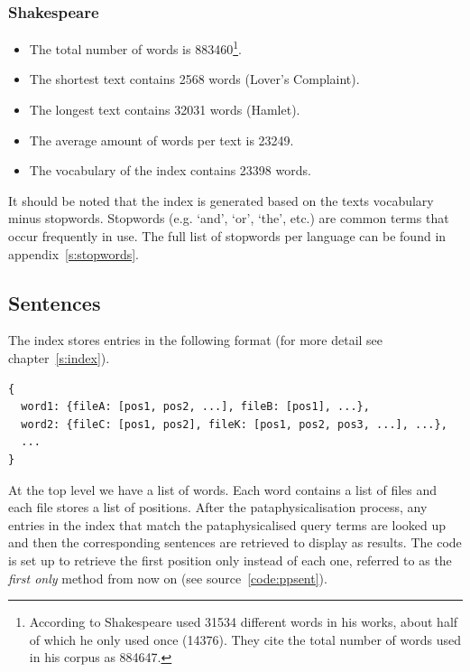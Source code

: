 \subsubsection{Shakespeare}
\label{s:shakestats}
\begin{itemize}
  \item The total number of words is \num{883460}\footnote{According to \autocite{Efron1976} Shakespeare used \num{31534} different words in his works, about half of which he only used once (\num{14376}). They cite the total number of words used in his corpus as \num{884647}.}.
  \item The shortest text contains \num{2568} words (Lover's Complaint).
  \item The longest text contains \num{32031} words (Hamlet).
  \item The average amount of words per text is \num{23249}.
  \item The vocabulary of the index contains \num{23398} words.
\end{itemize}

It should be noted that the index is generated based on the texts vocabulary minus stopwords. Stopwords (e.g. `and', `or', `the', etc.) are common terms that occur frequently in use. The full list of stopwords per language can be found in appendix~\ref{s:stopwords}.


\subsection{Sentences}
\label{s:sents}

The index stores entries in the following format (for more detail see chapter~\ref{s:index}).

\begin{verbatim}
{
  word1: {fileA: [pos1, pos2, ...], fileB: [pos1], ...},
  word2: {fileC: [pos1, pos2], fileK: [pos1, pos2, pos3, ...], ...},
  ...
}
\end{verbatim}

At the top level we have a list of words. Each word contains a list of files and each file stores a list of positions. After the pataphysicalisation process, any entries in the index that match the pataphysicalised query terms are looked up and then the corresponding sentences are retrieved to display as results. The code is set up to retrieve the first position only instead of each one, referred to as the \emph{first only} method from now on (see source~\ref{code:ppsent}).

